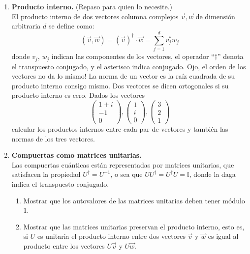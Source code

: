 \documentclass[a4paper,11pt,spanish]{article}
\def \barl {\begin{array}{rl}}
\def \ea {\end{array}}
\begin{document}

\author{C. Cormick}


\\

\\

\vspace{20pt}


\begin{enumerate}
   \item {\bf Producto interno.} (Repaso para quien lo necesite.)\\
   El producto interno de dos vectores columna complejos $\vec v, \vec w$ de dimensión arbitraria $d$ se define como:
  $$(\vec v, \vec w ) = (\vec v)^\dagger \cdot \vec w = \sum_{j=1}^d v_j^* w_j$$
  donde $v_j$, $w_j$ indican las componentes de los vectores, el operador ``$\dagger$'' denota el transpuesto conjugado, y el asterisco indica conjugado. Ojo, el orden de los vectores no da lo mismo! La norma de un vector es la ra\'iz cuadrada de su producto interno consigo mismo. Dos vectores se dicen ortogonales si su producto interno es cero. Dados los vectores 
$$ \left(\barl 1+i\\ -1~\\ 0 ~\ea \right), \left(\barl 1\\ i\\ 0 \ea \right), \left(\barl 3\\ 2\\ 1 \ea \right)
$$
calcular los productos internos entre cada par de vectores y tambi\'en las normas de los tres vectores.
\smallskip

 \item {\bf Compuertas como matrices unitarias.} \\
 Las compuertas cu\'anticas est\'an representadas por matrices unitarias, que satisfacen la propiedad $U^\dagger = U^{-1}$, o sea que $U U^\dagger = U^\dagger U = \mathbb{I}$, donde la daga indica el transpuesto conjugado.
 
 \begin{enumerate}
  \item Mostrar que los autovalores de las matrices unitarias deben tener m\'odulo 1.
  \item Mostrar que las matrices unitarias preservan el producto interno, esto es, si $U$ es unitaria el producto interno entre dos vectores $\vec v$ y $\vec w$ es igual al producto entre los vectores $U\vec v$ y $U\vec w$.
 \end{enumerate}


\end{enumerate}
\end{document}
